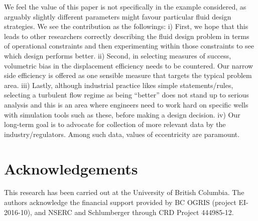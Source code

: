 \documentclass[review]{elsarticle}
\begin{document}
We feel the value of this paper is not specifically in the example considered, as arguably slightly different parameters might favour particular fluid design strategies. We see the contribution as the followings: i) First, we hope that this leads to other researchers correctly describing the fluid design problem in terms of operational constraints and then experimenting within those constraints to see which design performs better. ii) Second, in selecting measures of success, volumetric bias in the displacement efficiency needs to be countered. Our narrow side efficiency is offered as one sensible measure that targets the typical problem area. iii) Lastly, although industrial practice likes simple statements/rules, selecting a turbulent flow regime as being ``better'' does not stand up to serious analysis and this is an area where engineers need to work hard on specific wells with simulation tools such as these, before making a design decision.  iv) Our long-term goal is to advocate for collection of more relevant data by the industry/regulators. Among such data, values of eccentricity are paramount. 


\section*{Acknowledgements}
This research has been carried out at the University of British Columbia. The authors acknowledge the financial support provided by BC OGRIS (project EI-2016-10), and NSERC and Schlumberger through CRD Project 444985-12.




\end{document}
